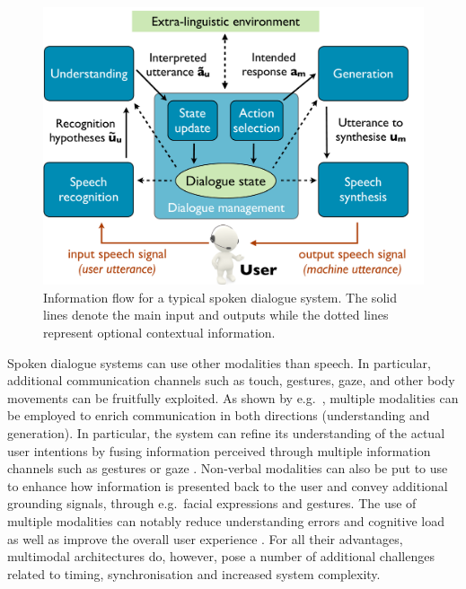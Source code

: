  \begin{figure}[h]
\centering
\vspace{5mm}
\includegraphics[scale=0.30]{imgs/architecture.pdf}
\vspace{5mm}
\caption{Information flow for a typical spoken dialogue system. The solid lines denote the main input and outputs while the dotted lines represent optional contextual information.}
\label{fig:architecture}
\end{figure}

Spoken dialogue systems can use other modalities than speech.  In particular, additional communication channels such as touch, gestures, gaze, and other body movements can be fruitfully exploited.  As shown by e.g.\ \cite{smartkom}, multiple modalities can be employed to enrich communication in both directions (understanding and generation). In particular, the system can refine its understanding of the actual user intentions by fusing information perceived through multiple information channels such as gestures \citep{stiefelhagen2004} or gaze \citep{koller2012}.  Non-verbal modalities can also be put to use to enhance how information is presented back to the user and convey additional grounding signals, through e.g.\ facial expressions and gestures. The use of multiple modalities can notably reduce understanding errors and cognitive load \citep{oviatt2004we} as well as improve the overall user experience \citep{JokinenH06}.  For all their advantages, multimodal architectures do, however, pose a number of additional challenges related to timing, synchronisation and increased system complexity. 


